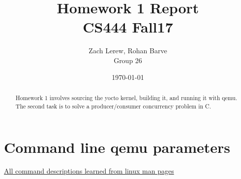 \documentclass[letterpaper,10pt,fleqn]{article}
\title{Homework 1 Report\\\large CS444 Fall17}
\author{Zach Lerew, Rohan Barve\\\large Group 26}
\date{\today}
\begin{document}
	\begin{titlingpage}
		\maketitle
		\begin{abstract}
			Homework 1 involves sourcing the yocto kernel, building it, and running it with qemu. The second task is to solve a producer/consumer concurrency problem in C.
		\end{abstract}
	\end{titlingpage}


	\section*{Command line qemu parameters}
	\href{https://linux.die.net/man/1/qemu-kvm}{All command descriptions learned from linux man pages}
\end{document}
